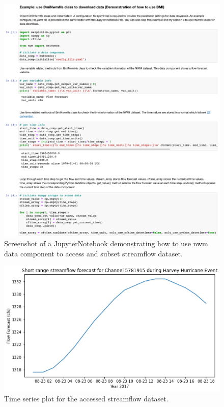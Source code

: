\documentclass[12pt]{amsart}
\begin{document}
\begin{figure}[h!]
\centering
\includegraphics[scale=0.9]{Figures/data_component1.png}
\caption{Screenshot of a JupyterNotebook demonstrating how to use nwm data component to access and subset streamflow dataset. }
\label{fig:data_component1}
\end{figure}

\begin{figure}[h!]
\centering
\includegraphics[scale=1]{Figures/data_component2.png}
\caption{Time series plot for the accessed streamflow dataset. }
\label{fig:data_component2}
\end{figure}
\end{document}
